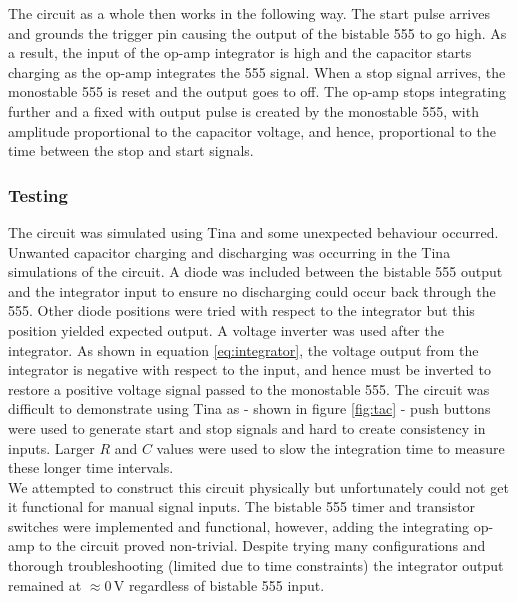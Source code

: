 \documentclass[%
 reprint,
 amsmath,amssymb,
 aps,
]{revtex4-2}
\begin{document}
        The circuit as a whole then works in the following way. The start pulse arrives and grounds the trigger pin causing the output of the bistable 555 to go high. As a result, the input of the op-amp integrator is high and the capacitor starts charging as the op-amp integrates the 555 signal. When a stop signal arrives, the monostable 555 is reset and the output goes to off. The op-amp stops integrating further and a fixed with output pulse is created by the monostable 555, with amplitude proportional to the capacitor voltage, and hence, proportional to the time between the stop and start signals.\\ 

        \subsubsection{Testing}

        The circuit was simulated using Tina and some unexpected behaviour occurred. Unwanted capacitor charging and discharging was occurring in the Tina simulations of the circuit. A diode was included between the bistable 555 output and the integrator input to ensure no discharging could occur back through the 555. Other diode positions were tried with respect to the integrator but this position yielded expected output. A voltage inverter was used after the integrator. As shown in equation \ref{eq:integrator}, the voltage output from the integrator is negative with respect to the input, and hence must be inverted to restore a positive voltage signal passed to the monostable 555. The circuit was difficult to demonstrate using Tina as - shown in figure \ref{fig:tac} - push buttons were used to generate start and stop signals and hard to create consistency in inputs. Larger $R$ and $C$ values were used to slow the integration time to measure these longer time intervals.\\

        We attempted to construct this circuit physically but unfortunately could not get it functional for manual signal inputs. The bistable 555 timer and transistor switches were implemented and functional, however, adding the integrating op-amp to the circuit proved non-trivial. Despite trying many configurations and thorough troubleshooting (limited due to time constraints) the integrator output remained at $\approx0\,\text{V}$ regardless of bistable 555 input.\\
\end{document}
